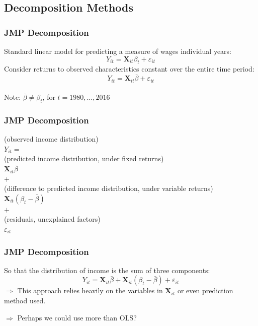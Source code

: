 \documentclass{beamer}
\begin{document}
\subsection{Decomposition Methods}
\begin{frame}
\frametitle{JMP Decomposition}
\pause
Standard linear model for predicting a measure of wages individual years:
\begin{equation}
Y_{it} = \mathbf{X}_{it}\beta_t + \varepsilon_{it}
\end{equation}
\pause
Consider returns to observed characteristics constant over the entire time period:
\begin{equation}
Y_{it} = \mathbf{X}_{it}\bar{\beta} + \varepsilon_{it}
\end{equation} \\
\pause
Note: \pause $\bar{\beta} \neq \beta_t$, for $t = 1980, \dots, 2016$
\end{frame}


\begin{frame}
\frametitle{JMP Decomposition}
\begin{center} \pause 
(observed income distribution) \\$Y_{it} = $  \vspace{0.5cm} \\  \pause 
(predicted income distribution, under fixed returns) \\ $\mathbf{X}_{it}\bar{\beta}$ \\
$+$ \pause \\
(difference to predicted income distribution, under variable returns) \\ $\mathbf{X}_{it}(\beta_t - \bar{\beta})$ \\
$+$ \pause \\
(residuals, unexplained factors) \\
$\varepsilon_{it}$
\end{center}


\end{frame}



\begin{frame}
\frametitle{JMP Decomposition}
So that the distribution of income is the sum of three components:
\begin{equation}
Y_{it} = \mathbf{X}_{it}\bar{\beta} + \mathbf{X}_{it}(\beta_t - \bar{\beta}) + \varepsilon_{it}
\end{equation} 
\pause
$\Rightarrow$ This approach relies heavily on the variables in $\mathbf{X}_{it}$ or even prediction method used.
\pause

$\Rightarrow$ Perhaps we could use more than OLS?
\end{frame}
\end{document}

